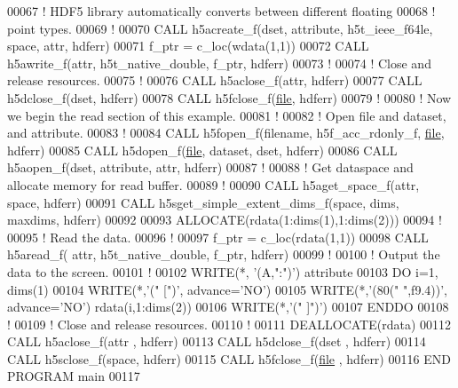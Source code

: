 \begin{DoxyCode}
00067   \textcolor{comment}{! HDF5 library automatically converts between different floating}
00068   \textcolor{comment}{! point types.}
00069   \textcolor{comment}{!}
00070   \textcolor{keyword}{CALL }h5acreate\_f(dset, attribute, h5t\_ieee\_f64le, space, attr, hdferr)
00071   f\_ptr = c\_loc(wdata(1,1))
00072   \textcolor{keyword}{CALL }h5awrite\_f(attr, h5t\_native\_double, f\_ptr, hdferr)
00073   \textcolor{comment}{!}
00074   \textcolor{comment}{! Close and release resources.}
00075   \textcolor{comment}{!}
00076   \textcolor{keyword}{CALL }h5aclose\_f(attr, hdferr)
00077   \textcolor{keyword}{CALL }h5dclose\_f(dset, hdferr)
00078   \textcolor{keyword}{CALL }h5fclose\_f(\hyperlink{structfile}{file}, hdferr)
00079   \textcolor{comment}{!}
00080   \textcolor{comment}{! Now we begin the read section of this example.}
00081   \textcolor{comment}{!}
00082   \textcolor{comment}{! Open file and dataset, and attribute.}
00083   \textcolor{comment}{!}
00084   \textcolor{keyword}{CALL }h5fopen\_f(filename, h5f\_acc\_rdonly\_f, \hyperlink{structfile}{file}, hdferr)
00085   \textcolor{keyword}{CALL }h5dopen\_f(\hyperlink{structfile}{file}, dataset, dset, hdferr)
00086   \textcolor{keyword}{CALL }h5aopen\_f(dset, attribute, attr, hdferr)
00087   \textcolor{comment}{!}
00088   \textcolor{comment}{! Get dataspace and allocate memory for read buffer.}
00089   \textcolor{comment}{!}
00090   \textcolor{keyword}{CALL }h5aget\_space\_f(attr, space, hdferr)
00091   \textcolor{keyword}{CALL }h5sget\_simple\_extent\_dims\_f(space, dims, maxdims, hdferr)
00092 
00093   \textcolor{keyword}{ALLOCATE}(rdata(1:dims(1),1:dims(2)))
00094   \textcolor{comment}{!}
00095   \textcolor{comment}{! Read the data.}
00096   \textcolor{comment}{!}
00097   f\_ptr = c\_loc(rdata(1,1))
00098   \textcolor{keyword}{CALL }h5aread\_f( attr, h5t\_native\_double, f\_ptr, hdferr)
00099   \textcolor{comment}{!}
00100   \textcolor{comment}{! Output the data to the screen.}
00101   \textcolor{comment}{!}
00102   \textcolor{keyword}{WRITE}(*, \textcolor{stringliteral}{'(A,":")'}) attribute
00103   \textcolor{keywordflow}{DO} i=1, dims(1)
00104      \textcolor{keyword}{WRITE}(*,\textcolor{stringliteral}{'(" [")'}, advance=\textcolor{stringliteral}{'NO'})
00105      \textcolor{keyword}{WRITE}(*,\textcolor{stringliteral}{'(80(" ",f9.4))'}, advance=\textcolor{stringliteral}{'NO'}) rdata(i,1:dims(2))
00106      \textcolor{keyword}{WRITE}(*,\textcolor{stringliteral}{'(" ]")'})
00107 \textcolor{keywordflow}{  ENDDO}
00108   \textcolor{comment}{!}
00109   \textcolor{comment}{! Close and release resources.}
00110   \textcolor{comment}{!}
00111   \textcolor{keyword}{DEALLOCATE}(rdata)
00112   \textcolor{keyword}{CALL }h5aclose\_f(attr , hdferr)
00113   \textcolor{keyword}{CALL }h5dclose\_f(dset , hdferr)
00114   \textcolor{keyword}{CALL }h5sclose\_f(space, hdferr)
00115   \textcolor{keyword}{CALL }h5fclose\_f(\hyperlink{structfile}{file} , hdferr)
00116 \textcolor{keyword}{END PROGRAM }main
00117 
\end{DoxyCode}
